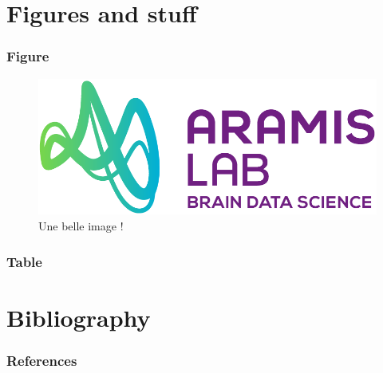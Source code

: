 \documentclass[
	11pt, %
	aspectratio=169, %
]{beamer}
\begin{document}
\section{Figures and stuff}

\begin{frame}
  \frametitle{Figure}

  \begin{figure}
    \includegraphics[height=.6\paperheight]{logos/logo_ARAMISLAB.png}
    \caption{Une belle image !}
  \end{figure} 

\end{frame}

\begin{frame}
  \frametitle{Table}

  

\end{frame}


\section{Bibliography}

\begin{frame}
  \frametitle{References}

\end{frame}
\end{document}
